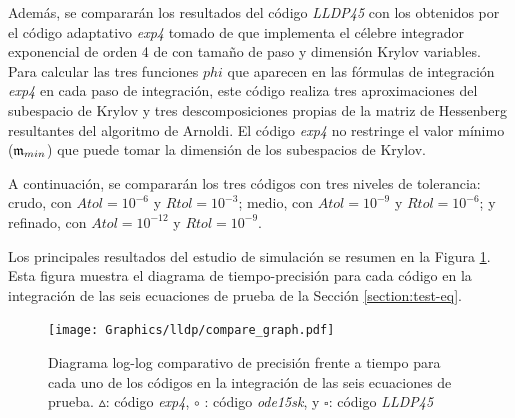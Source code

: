Además, se compararán los resultados del código \emph{LLDP45} con los obtenidos por el código adaptativo \emph{exp4} tomado de \cite{jansing2011expode} que implementa el célebre integrador exponencial de orden 4 de \cite{hochbruck1998exponential} con tamaño de paso y dimensión Krylov variables. Para calcular las tres funciones $phi$ que aparecen en las fórmulas de integración \emph{exp4} en cada paso de integración, este código realiza tres aproximaciones del subespacio de Krylov y tres descomposiciones propias de la matriz de Hessenberg resultantes del algoritmo de Arnoldi. El código \emph{exp4} no restringe el
valor mínimo ($\mathfrak{m}_{min}$) que puede tomar la dimensión de los subespacios de Krylov.

A continuación, se compararán los tres códigos con tres niveles de tolerancia: crudo, con $ Atol = 10^{-6}$ y $Rtol = 10^{-3}$; medio, con $Atol = 10^{-9}$ y $Rtol = 10^{-6}$; y refinado, con $ Atol = 10^{-12}$ y $Rtol = 10^{-9}$.

Los principales resultados del estudio de simulación se resumen en la Figura \ref{num-exp-lldp-var-step:Fig1}. Esta figura muestra el diagrama de tiempo-precisión para cada código en la integración de las seis ecuaciones de prueba de la Sección \ref{section:test-eq}.

\begin{figure}
	\begin{center}
    \hspace{-0.5in}
	\texttt{[image: Graphics/lldp/compare\_graph.pdf]}
	\vspace{-0.75in}
	\caption{ Diagrama log-log comparativo de precisión frente a tiempo para cada uno de los códigos en la integración de las seis ecuaciones de prueba. $\vartriangle$: código \emph{exp4}, $\circ$ : código \emph{ode15sk}, y $\square$: código \emph{LLDP45}}
	\label{num-exp-lldp-var-step:Fig1}
	\end{center}
\end{figure}

